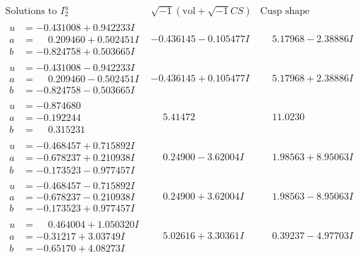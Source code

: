 \documentclass[1p]{elsarticle_modified}
\theoremstyle{definition}
\newcommand{\I}{\sqrt{-1}}
\begin{document}
$$\begin{array}{c|c|c}  
\text{Solutions to }I^u_{2}& \I (\text{vol} + \sqrt{-1}CS) & \text{Cusp shape}\\
 \hline 
\begin{aligned}
u &= -0.431008 + 0.942233 I \\
a &= \phantom{-}0.209460 + 0.502451 I \\
b &= -0.824758 + 0.503665 I\end{aligned}
 & -0.436145 - 0.105477 I & \phantom{-}5.17968 - 2.38886 I \\ \hline\begin{aligned}
u &= -0.431008 - 0.942233 I \\
a &= \phantom{-}0.209460 - 0.502451 I \\
b &= -0.824758 - 0.503665 I\end{aligned}
 & -0.436145 + 0.105477 I & \phantom{-}5.17968 + 2.38886 I \\ \hline\begin{aligned}
u &= -0.874680\phantom{ +0.000000I} \\
a &= -0.192244\phantom{ +0.000000I} \\
b &= \phantom{-}0.315231\phantom{ +0.000000I}\end{aligned}
 & \phantom{-}5.41472\phantom{ +0.000000I} & \phantom{-}11.0230\phantom{ +0.000000I} \\ \hline\begin{aligned}
u &= -0.468457 + 0.715892 I \\
a &= -0.678237 + 0.210938 I \\
b &= -0.173523 - 0.977457 I\end{aligned}
 & \phantom{-}0.24900 - 3.62004 I & \phantom{-}1.98563 + 8.95063 I \\ \hline\begin{aligned}
u &= -0.468457 - 0.715892 I \\
a &= -0.678237 - 0.210938 I \\
b &= -0.173523 + 0.977457 I\end{aligned}
 & \phantom{-}0.24900 + 3.62004 I & \phantom{-}1.98563 - 8.95063 I \\ \hline\begin{aligned}
u &= \phantom{-}0.464004 + 1.050320 I \\
a &= -0.31217 + 3.03749 I \\
b &= -0.65170 + 4.08273 I\end{aligned}
 & \phantom{-}5.02616 + 3.30361 I & \phantom{-}0.39237 - 4.97703 I \\ \hline\begin{aligned}

\end{aligned}
\end{array}$$
\end{document}
